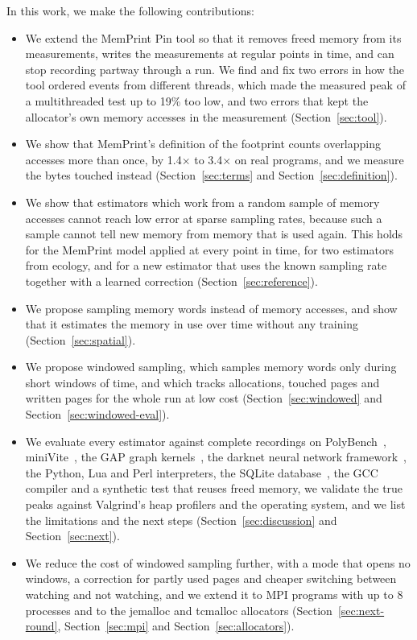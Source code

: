 \documentclass[11pt]{article}
\newcommand{\memprint}{MemPrint}
\newcommand{\secref}[1]{Section~\ref{#1}}
\begin{document}
In this work, we make the following contributions:
\begin{itemize}
\item We extend the \memprint{} Pin tool so that it removes freed memory from its measurements, writes the measurements at regular points in time, and can stop recording partway through a run. We find and fix two errors in how the tool ordered events from different threads, which made the measured peak of a multithreaded test up to 19\% too low, and two errors that kept the allocator's own memory accesses in the measurement (\secref{sec:tool}).
\item We show that \memprint{}'s definition of the footprint counts overlapping accesses more than once, by 1.4$\times$ to 3.4$\times$ on real programs, and we measure the bytes touched instead (\secref{sec:terms} and \secref{sec:definition}).
\item We show that estimators which work from a random sample of memory accesses cannot reach low error at sparse sampling rates, because such a sample cannot tell new memory from memory that is used again. This holds for the \memprint{} model applied at every point in time, for two estimators from ecology, and for a new estimator that uses the known sampling rate together with a learned correction (\secref{sec:reference}).
\item We propose sampling memory words instead of memory accesses, and show that it estimates the memory in use over time without any training (\secref{sec:spatial}).
\item We propose windowed sampling, which samples memory words only during short windows of time, and which tracks allocations, touched pages and written pages for the whole run at low cost (\secref{sec:windowed} and \secref{sec:windowed-eval}).
\item We evaluate every estimator against complete recordings on PolyBench~\cite{polybench}, miniVite~\cite{minivite}, the GAP graph kernels~\cite{beamer2015gap}, the darknet neural network framework~\cite{darknet13}, the Python, Lua and Perl interpreters, the SQLite database~\cite{sqlite}, the GCC compiler and a synthetic test that reuses freed memory, we validate the true peaks against Valgrind's heap profilers and the operating system, and we list the limitations and the next steps (\secref{sec:discussion} and \secref{sec:next}).
\item We reduce the cost of windowed sampling further, with a mode that opens no windows, a correction for partly used pages and cheaper switching between watching and not watching, and we extend it to MPI programs with up to 8 processes and to the jemalloc and tcmalloc allocators (\secref{sec:next-round}, \secref{sec:mpi} and \secref{sec:allocators}).
\end{itemize}
\end{document}
